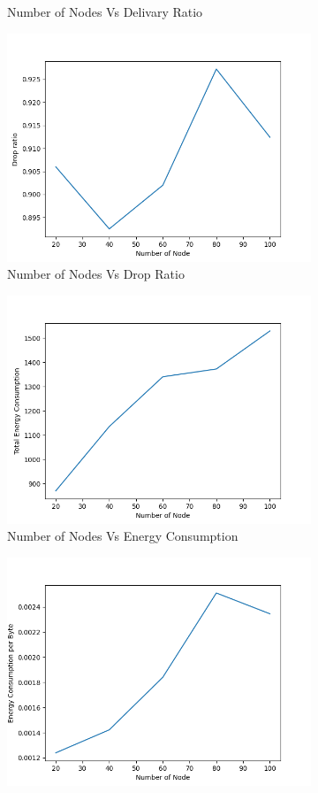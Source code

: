 \begin{figure}[h]
\begin{subfigure}{.5\textwidth}
     \caption{Number of Nodes Vs Delivary Ratio}
     \label{node_delivery_mobile}
\end{subfigure}
\begin{subfigure}{.5\textwidth}
  \centering
  \includegraphics[width=.8\linewidth]{_11_2_mobile/NumberofNodevsDropRatio.png}
     \caption{Number of Nodes Vs Drop Ratio}
     \label{node_drop_mobile}
\end{subfigure}
\begin{subfigure}{.5\textwidth}
  \centering
  \includegraphics[width=.8\linewidth]{_11_2_mobile/NumberofNodevsTotalEnergyConsumption.png}
     \caption{Number of Nodes Vs Energy Consumption}
     \label{node_energy_mobile}
\end{subfigure}
\begin{subfigure}{.5\textwidth}
  \centering
  \includegraphics[width=.8\linewidth]{_11_2_mobile/NumberofNodevsEnergyConsumptionperByte.png}

\end{subfigure}
\end{figure}
